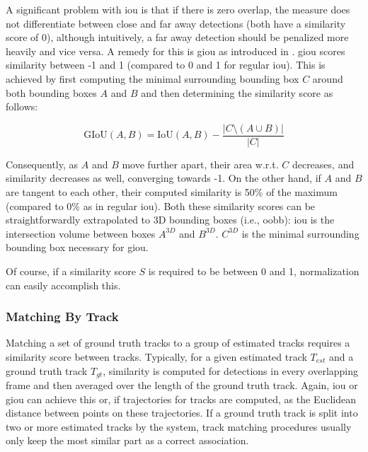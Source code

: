\documentclass[headsepline, hidelinks, footsepline, footinclude=false, oneside, fontsize=11pt, paper=a4, listof=totoc, bibliography=totoc]{scrbook}
\begin{document}
A significant problem with \gls{iou} is that if there is zero overlap, the measure does not differentiate between close and far away detections (both have a similarity score of 0), although intuitively, a far away detection should be
penalized more heavily and vice versa. 
A remedy for this is \gls{giou} as introduced in \cite{rezatofighiGeneralizedIntersectionUnion2019}.
\gls{giou} scores similarity between -1 and 1 (compared to 0 and 1 for regular \gls{iou}). 
\newpage
This is achieved by first computing the minimal surrounding bounding box \(C\) around both bounding boxes \(A\) and \(B\) and then determining the similarity score as follows:

\begin{equation}
\label{eq:giou}
\text{GIoU}(A, B) = \text{IoU}(A, B) - \frac{|C \setminus (A \cup B)|}{|C|}
\end{equation}

Consequently, as \(A\) and \(B\) move further apart, their area w.r.t. \(C\) decreases, and similarity decreases as well, converging towards -1. 
On the other hand, if \(A\) and \(B\) are tangent to each other, their computed similarity is 50\% of the maximum (compared to 0\% as in regular \gls{iou}).
Both these similarity scores can be straightforwardly extrapolated to 3D bounding boxes (i.e., \gls{oobb}): 
\gls{iou} is the intersection volume between boxes \(A^{3D}\) and \(B^{3D}\). \(C^{3D}\) is the minimal surrounding bounding box necessary for \gls{giou}. 

Of course, if a similarity score \(S\) is required to be between 0 and 1, normalization can easily accomplish this.

\subsubsection{Matching By Track}
\label{sec:org6ea4e13}
    Matching a set of ground truth tracks to a group of estimated tracks requires a similarity score between tracks. 
Typically, for a given estimated track \(T_{est}\) and a ground truth track \(T_{gt}\), similarity is computed for detections in every overlapping frame and then averaged over the length of the ground truth track.
Again, \gls{iou} or \gls{giou} can achieve this or, if trajectories for tracks are computed, as the Euclidean distance between points on these trajectories.
If a ground truth track is split into two or more estimated tracks by the system, track matching procedures usually only keep the most similar part as a correct association.
\end{document}
